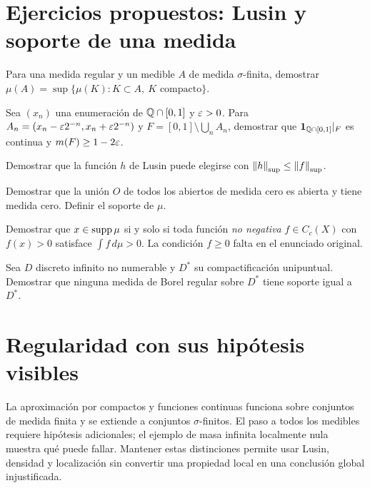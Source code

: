 \section{Ejercicios propuestos: Lusin y soporte de una medida}
\begin{ejercicio}\label{ej:v2-l32-1}
Para una medida regular y un medible $A$ de medida $\sigma$-finita, demostrar $\mu(A)=\sup\{\mu(K):K\subset A,\ K\text{ compacto}\}$.
\end{ejercicio}

\begin{ejercicio}\label{ej:v2-l32-2}
Sea $(x_n)$ una enumeración de $\mathbb Q\cap[0,1]$ y $\varepsilon>0$. Para $A_n=(x_n-\varepsilon2^{-n},x_n+\varepsilon2^{-n})$ y $F=[0,1]\setminus\bigcup_nA_n$, demostrar que $\mathbf1_{\mathbb Q\cap[0,1]}|_F$ es continua y $m(F)\ge1-2\varepsilon$.
\end{ejercicio}

\begin{ejercicio}\label{ej:v2-l32-3}
Demostrar que la función $h$ de Lusin puede elegirse con $\left\lVert h\right\rVert_{\mathrm{sup}}\le\left\lVert f\right\rVert_{\mathrm{sup}}$.
\end{ejercicio}

\begin{ejercicio}\label{ej:v2-l32-4}
Demostrar que la unión $O$ de todos los abiertos de medida cero es abierta y tiene medida cero. Definir el soporte de $\mu$.
\end{ejercicio}

\begin{ejercicio}\label{ej:v2-l32-5}
Demostrar que $x\in\operatorname{supp}\mu$ si y solo si toda función \emph{no negativa} $f\in C_c(X)$ con $f(x)>0$ satisface $\int f\,d\mu>0$. La condición $f\ge0$ falta en el enunciado original.
\end{ejercicio}

\begin{ejercicio}\label{ej:v2-l32-6}
Sea $D$ discreto infinito no numerable y $D^*$ su compactificación unipuntual. Demostrar que ninguna medida de Borel regular sobre $D^*$ tiene soporte igual a $D^*$.
\end{ejercicio}

\section{Regularidad con sus hipótesis visibles}
La aproximación por compactos y funciones continuas funciona sobre conjuntos de medida finita y se extiende a conjuntos $\sigma$-finitos. El paso a todos los medibles requiere hipótesis adicionales; el ejemplo de masa infinita localmente nula muestra qué puede fallar. Mantener estas distinciones permite usar Lusin, densidad y localización sin convertir una propiedad local en una conclusión global injustificada.
